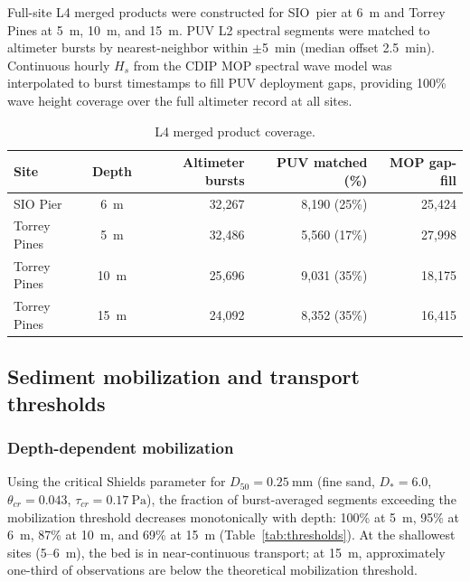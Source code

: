 Full-site L4 merged products were constructed for SIO~pier at
\SI{6}{\meter} and Torrey Pines at \SI{5}{\meter}, \SI{10}{\meter},
and \SI{15}{\meter}. PUV L2 spectral segments were matched to
altimeter bursts by nearest-neighbor within $\pm$\SI{5}{\minute}
(median offset \SI{2.5}{\minute}). Continuous hourly $H_s$ from the
CDIP MOP spectral wave model was interpolated to burst timestamps to
fill PUV deployment gaps, providing 100\% wave height coverage over
the full altimeter record at all sites.

\begin{table}[h]
\centering
\caption{L4 merged product coverage.}
\label{tab:l4_coverage}
\begin{tabular}{lcrrr}
\toprule
Site & Depth & Altimeter bursts & PUV matched (\%) & MOP gap-fill \\
\midrule
SIO Pier & 6~m & 32{,}267 & 8{,}190 (25\%) & 25{,}424 \\
Torrey Pines & 5~m & 32{,}486 & 5{,}560 (17\%) & 27{,}998 \\
Torrey Pines & 10~m & 25{,}696 & 9{,}031 (35\%) & 18{,}175 \\
Torrey Pines & 15~m & 24{,}092 & 8{,}352 (35\%) & 16{,}415 \\
\bottomrule
\end{tabular}
\end{table}

\subsection{Sediment mobilization and transport thresholds}

\subsubsection{Depth-dependent mobilization}

Using the \citet{soulsby1997} critical Shields parameter for
$D_{50} = \SI{0.25}{\milli\meter}$ (fine sand, $D_* = 6.0$,
$\theta_{cr} = 0.043$, $\tau_{cr} = \SI{0.17}{\pascal}$), the
fraction of burst-averaged segments exceeding the mobilization
threshold decreases monotonically with depth: 100\% at \SI{5}{\meter},
95\% at \SI{6}{\meter}, 87\% at \SI{10}{\meter}, and 69\% at
\SI{15}{\meter} (Table~\ref{tab:thresholds}). At the shallowest
sites (5--6~m), the bed is in near-continuous transport; at
\SI{15}{\meter}, approximately one-third of observations are below
the theoretical mobilization threshold.

